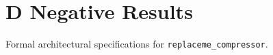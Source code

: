\section{D Negative Results}

Formal architectural specifications for \texttt{replaceme_compressor}.

